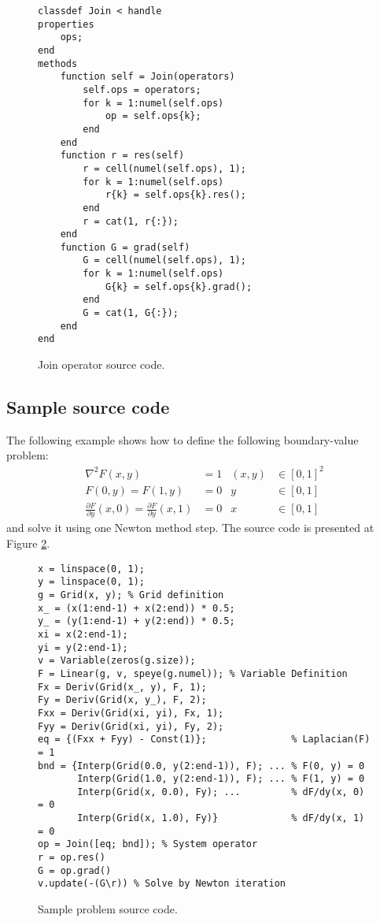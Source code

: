 \documentclass[MSc,beforeExam]{iitcsthesis}
\newcommand{\deriv}[2]{\frac{\partial #1}{\partial #2}}
\newcommand\Laplacian{\nabla^2}
\begin{document}
\begin{figure}[htpb]
\begin{verbatim}
classdef Join < handle
properties
    ops;
end
methods
    function self = Join(operators)
        self.ops = operators;
        for k = 1:numel(self.ops)
        	op = self.ops{k}; 
        end
    end
    function r = res(self)
        r = cell(numel(self.ops), 1);
        for k = 1:numel(self.ops)
            r{k} = self.ops{k}.res();
        end
        r = cat(1, r{:});
    end
    function G = grad(self) 
        G = cell(numel(self.ops), 1);
        for k = 1:numel(self.ops)
            G{k} = self.ops{k}.grad();
        end
        G = cat(1, G{:});
    end
end
\end{verbatim}
\caption{Join operator source code.} \label{fig:join.m}
\end{figure}

\subsection{Sample source code}
The following example shows how to define the following boundary-value problem:
\begin{align}
\Laplacian F(x,y) &= 1 & (x,y) &\in [0,1]^2 \\
F(0, y) = F(1, y) &= 0 & y &\in [0,1] \\
\deriv{F}{y}(x, 0) = \deriv{F}{y}(x, 1) &= 0 & x &\in [0,1]
\end{align}
and solve it using one Newton method step.
The source code is presented at Figure \ref{fig:sample.m}.
\begin{figure}[htpb]
\begin{verbatim}
x = linspace(0, 1); 
y = linspace(0, 1);
g = Grid(x, y); % Grid definition
x_ = (x(1:end-1) + x(2:end)) * 0.5;
y_ = (y(1:end-1) + y(2:end)) * 0.5;
xi = x(2:end-1);
yi = y(2:end-1);
v = Variable(zeros(g.size)); 
F = Linear(g, v, speye(g.numel)); % Variable Definition
Fx = Deriv(Grid(x_, y), F, 1);
Fy = Deriv(Grid(x, y_), F, 2);
Fxx = Deriv(Grid(xi, yi), Fx, 1);
Fyy = Deriv(Grid(xi, yi), Fy, 2);
eq = {(Fxx + Fyy) - Const(1)};               % Laplacian(F) = 1
bnd = {Interp(Grid(0.0, y(2:end-1)), F); ... % F(0, y) = 0
	   Interp(Grid(1.0, y(2:end-1)), F); ... % F(1, y) = 0
       Interp(Grid(x, 0.0), Fy); ...         % dF/dy(x, 0) = 0
       Interp(Grid(x, 1.0), Fy)}		     % dF/dy(x, 1) = 0       
op = Join([eq; bnd]); % System operator
r = op.res()
G = op.grad()
v.update(-(G\r)) % Solve by Newton iteration
\end{verbatim}
\caption{Sample problem source code.} \label{fig:sample.m}
\end{figure}
\end{document}

